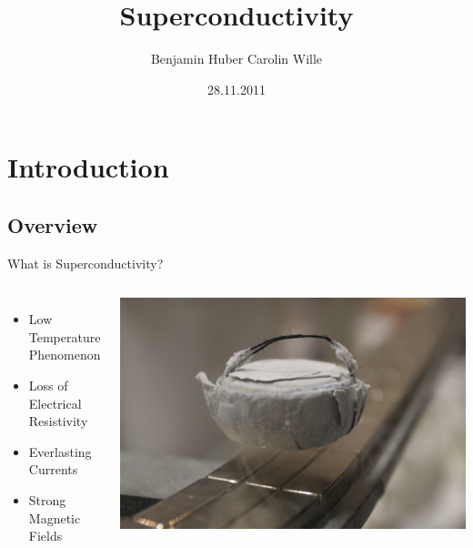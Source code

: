 \documentclass{beamer}
\begin{document}
\title{Superconductivity}   
\author{Benjamin Huber \qquad Carolin Wille} 
\date{28.11.2011}

\begin{frame}
\titlepage
\end{frame}



\section{Introduction} %

\subsection{Overview}
\begin{frame}{What is Superconductivity?}
\begin{columns}
        \begin{itemize}[<+->]
\item Low Temperature Phenomenon
\item Loss of Electrical Resistivity 
\item Everlasting Currents
\item Strong Magnetic Fields
\end{itemize}
                
        \includegraphics[width=\textwidth]{img/levitation2.jpg}
\end{columns}
\end{frame}
\end{document}
